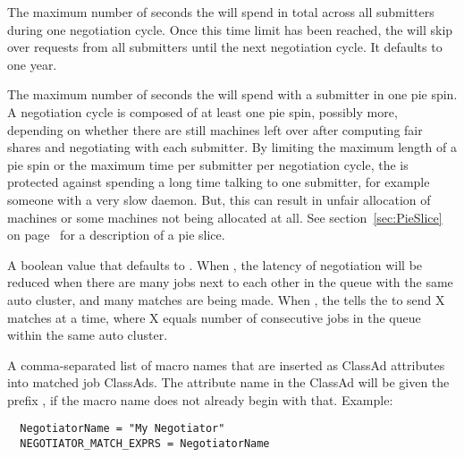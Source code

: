 \begin{description}
\label{param:NegotiatorMaxTimePerCycle}
\item[\Macro{NEGOTIATOR\_MAX\_TIME\_PER\_CYCLE}]
  The maximum number of seconds
  the  will spend in total across all submitters during one
  negotiation cycle.  Once this time limit has been reached, the
   will skip
  over requests from all submitters until the next negotiation cycle.
  It defaults to one year.

\label{param:NegotiatorMaxTimePerPieSpin}
\item[\Macro{NEGOTIATOR\_MAX\_TIME\_PER\_PIESPIN}]
  The maximum number of seconds the
   will spend with a submitter in one pie spin.
  A negotiation cycle is composed of at least one pie spin, possibly more,
  depending on whether there are still machines left over after
  computing fair shares and negotiating with each submitter.  By
  limiting the maximum length of a pie spin or the maximum time per
  submitter per negotiation cycle, the  is protected
  against spending a long time talking to one submitter, for example someone
  with a very slow  daemon.
  But, this can result in unfair allocation of
  machines or some machines not being allocated at all.
  See section~\ref{sec:PieSlice} on page~\pageref{sec:PieSlice}
  for a description of a pie slice.

\label{param:UseResourceRequestCounts}
\item[\Macro{USE\_RESOURCE\_REQUEST\_COUNTS}]
  A boolean value that defaults to . 
  When ,
  the latency of negotiation will be reduced 
  when there are many jobs next to each other in the queue
  with the same auto cluster, and many matches are being made.
  When ,
  the  tells the  
  to send X matches at a time,
  where X equals number of consecutive jobs in the queue 
  within the same auto cluster.

\label{param:NegotiatorMatchExprs}
\item[\Macro{NEGOTIATOR\_MATCH\_EXPRS}]
  A comma-separated list of macro names that are inserted as
  ClassAd attributes into matched job ClassAds.
  The attribute name in the ClassAd will be given the prefix
  , 
  if the macro name does not already begin with that.
  Example:

\footnotesize
\begin{verbatim}
  NegotiatorName = "My Negotiator"
  NEGOTIATOR_MATCH_EXPRS = NegotiatorName
\end{verbatim}
\normalsize


\end{description}

